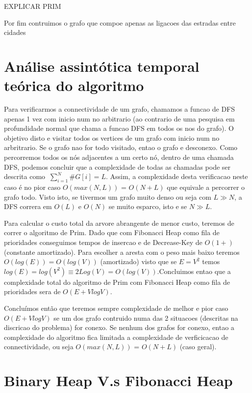 \documentclass{scrartcl}
\begin{document}
EXPLICAR PRIM


Por fim contruimos o grafo que compoe apenas as ligacoes das estradas entre cidades



 \cite{dfs:CLRS}


\section*{Análise assintótica temporal teórica do algoritmo}

Para verificarmos a connectividade de um grafo, chamamos a funcao de DFS apenas 1 vez com inicio num no arbitrario (ao contrario de uma pesquisa em profundidade normal que chama a funcao DFS em todos os nos do grafo). O objetivo disto e visitar todos os vertices de um grafo com inicio num no arbritrario. Se o grafo nao for todo visitado, entao o grafo e desconexo. Como percorremos todos os nós adjacentes a um certo nó, dentro de uma chamada DFS, podemos concluir que a complexidade de todas as chamadas pode ser descrita como $\ \sum_{i=1}^{N} \#G[i] = L$. Assim, a complexidade desta verificacao neste caso é no pior caso $O(max(N,L))$ = $O(N+L)$ que equivale a percorrer o grafo todo. Visto isto, se tivermos um grafo muito denso ou seja com $L \gg N$, a DFS correra em $O(L)$ e $O(N)$ se muito esparco, isto e se $N \gg L$.

Para calcular o custo total da arvore abrangente de menor custo, teremos de correr o algoritmo de Prim. Dado que com Fibonacci Heap como fila de prioridades conseguimos tempos de insercao e de Decrease-Key de $O(1+)$ (constante amortizado). Para escolher a aresta com o peso mais baixo teremos $O(log(E)) = O(log(V))$ (amortizado) visto que se $E = V^2$ temos $log(E) = log(V^2) \equiv 2Log(V) = O(log(V))$.Concluimos entao que a complexidade total do algoritmo de Prim com Fibonacci Heap como fila de prioridades sera de $O(E + V log V)$.

Concluímos então que teremos sempre complexidade de melhor e pior caso $O(E + V log V)$ se um dos grafo contruido numa das 2 situacoes (descritas na discricao do problema) for conexo. Se nenhum dos grafos for conexo, entao a complexidade do algoritmo fica limitada a complexidade de verficicacao de connectividade, ou seja $O(max(N,L))$ = $O(N+L)$ (caso geral).

\section*{Binary Heap V.s Fibonacci Heap}
\end{document}
